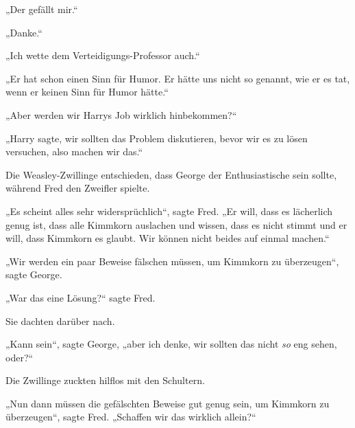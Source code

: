 „Der gefällt mir.“

„Danke.“

„Ich wette dem Verteidigungs-Professor auch.“

„Er hat schon einen Sinn für Humor. Er hätte uns nicht so genannt, wie er es tat, wenn er keinen Sinn für Humor hätte.“

„Aber werden wir Harrys Job wirklich hinbekommen?“

„Harry sagte, wir sollten das Problem diskutieren, bevor wir es zu lösen versuchen, also machen wir das.“

Die Weasley-Zwillinge entschieden, dass George der Enthusiastische sein sollte, während Fred den Zweifler spielte.

„Es scheint alles sehr widersprüchlich“, sagte Fred. „Er will, dass es lächerlich genug ist, dass alle Kimmkorn auslachen und wissen, dass es nicht stimmt und er will, dass Kimmkorn es glaubt. Wir können nicht beides auf einmal machen.“

„Wir werden ein paar Beweise fälschen müssen, um Kimmkorn zu überzeugen“, sagte George.

„War das eine Lösung?“ sagte Fred.

Sie dachten darüber nach.

„Kann sein“, sagte George, „aber ich denke, wir sollten das nicht \emph{so} eng sehen, oder?“

Die Zwillinge zuckten hilflos mit den Schultern.

„Nun dann müssen die gefälschten Beweise gut genug sein, um Kimmkorn zu überzeugen“, sagte Fred. „Schaffen wir das wirklich allein?“


